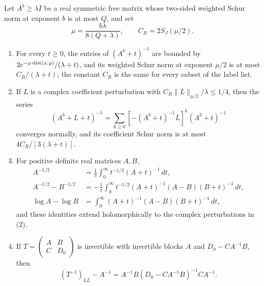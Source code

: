 \begin{lemma}\label{ch16:lem:matrix-functions}
Let $A^b\ge\lambda I$ be a real symmetric free matrix whose two-sided weighted Schur norm at exponent $b$ is at most $Q$, and set
\[
 \mu=\frac{b\lambda}{8(Q+\lambda)},\qquad
 C_R=2S_J(\mu/2).
\]
\begin{enumerate}
\item For every $t\ge0$, the entries of $(A^b+t)^{-1}$ are bounded by $2e^{-\mu\operatorname{dist}(x,y)}/(\lambda+t)$, and its weighted Schur norm at exponent $\mu/2$ is at most $C_R/(\lambda+t)$; the constant $C_R$ is the same for every subset of the label list.
\item If $L$ is a complex coefficient perturbation with $C_R\|L\|_{\mu/2}/\lambda\le1/4$, then the series
\begin{equation}\label{ch16:eq:resolvent-series}
 (A^b+L+t)^{-1}
 =\sum_{k\ge0}[-(A^b+t)^{-1}L]^k(A^b+t)^{-1}
\end{equation}
converges normally, and its coefficient Schur norm is at most $4C_R/[3(\lambda+t)]$.
\item For positive definite real matrices $A,B$,
\begin{align}
 A^{-1/2}&=\frac1\pi\int_0^\infty t^{-1/2}(A+t)^{-1}\,dt,
                                                    \label{ch16:eq:sqrt}\\
 A^{-1/2}-B^{-1/2}
 &=-\frac1\pi\int_0^\infty t^{-1/2}
        (A+t)^{-1}(A-B)(B+t)^{-1}\,dt,                \label{ch16:eq:sqrt-difference}\\
 \log A-\log B
 &=\int_0^\infty (A+t)^{-1}(A-B)(B+t)^{-1}\,dt,      \label{ch16:eq:log-difference}
\end{align}
and these identities extend holomorphically to the complex perturbations in (2).
\item If $T=\begin{pmatrix}A&B\\ C&D_0\end{pmatrix}$ is invertible with invertible blocks $A$ and $D_0-CA^{-1}B$, then
\begin{equation}\label{ch16:eq:block-inverse}
 (T^{-1})_{LL}-A^{-1}
     =A^{-1}B(D_0-CA^{-1}B)^{-1}CA^{-1}.
\end{equation}
\end{enumerate}
\end{lemma}

